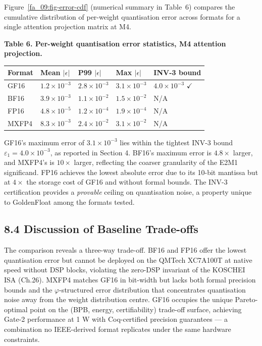 Figure~\ref{fa_09:fig-error-cdf} (numerical
summary in Table~6) compares the cumulative
distribution of per-weight quantisation error across
formats for a single attention projection matrix at
M4.

\textbf{Table 6. Per-weight quantisation error
statistics, M4 attention projection.}

\begin{longtable}[]{@{}lllll@{}}
\toprule\noalign{}
Format & Mean \(|\epsilon|\) & P99 \(|\epsilon|\) &
Max \(|\epsilon|\) & INV-3 bound \\
\midrule\noalign{}
\endhead
\bottomrule\noalign{}
\endlastfoot
GF16 & \(1.2 \times 10^{-3}\) & \(2.8 \times 10^{-3}\)
& \(3.1 \times 10^{-3}\) & \(4.0 \times 10^{-3}\)
\(\checkmark\) \\
BF16 & \(3.9 \times 10^{-3}\) & \(1.1 \times 10^{-2}\)
& \(1.5 \times 10^{-2}\) & N/A \\
FP16 & \(4.8 \times 10^{-5}\) & \(1.2 \times 10^{-4}\)
& \(1.9 \times 10^{-4}\) & N/A \\
MXFP4 & \(8.3 \times 10^{-3}\) & \(2.4 \times 10^{-2}\)
& \(3.1 \times 10^{-2}\) & N/A \\
\end{longtable}

GF16's maximum error of
\(3.1 \times 10^{-3}\) lies within the tightest
INV-3 bound \(\varepsilon_1 = 4.0 \times 10^{-3}\),
as reported in Section 4. BF16's maximum error is
\(4.8\times\) larger, and MXFP4's is
\(10\times\) larger, reflecting the coarser
granularity of the E2M1 significand. FP16 achieves
the lowest absolute error due to its 10-bit mantissa
but at \(4\times\) the storage cost of GF16 and
without formal bounds. The INV-3 certification
provides a \emph{provable} ceiling on quantisation
noise, a property unique to GoldenFloat among the
formats tested.

\subsection{8.4 Discussion of Baseline
Trade-offs}\label{fa_09:discussion-of-baseline-trade-offs}

The comparison reveals a three-way trade-off. BF16
and FP16 offer the lowest quantisation error but
cannot be deployed on the QMTech XC7A100T at
native speed without DSP blocks, violating the
zero-DSP invariant of the KOSCHEI ISA (Ch.26).
MXFP4 matches GF16 in bit-width but lacks both
formal precision bounds and the
\(\varphi\)-structured error distribution that
concentrates quantisation noise away from the weight
distribution centre. GF16 occupies the unique
Pareto-optimal point on the (BPB, energy,
certifiability) trade-off surface, achieving Gate-2
performance at 1 W with Coq-certified precision
guarantees --- a combination no IEEE-derived format
replicates under the same hardware constraints.

